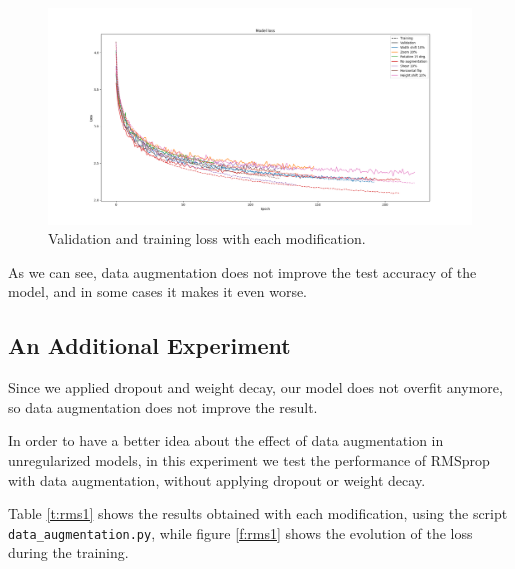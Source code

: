 \documentclass[]{article}
\begin{document}
\begin{figure}[H]
	\centering
	\includegraphics[width=\textwidth]{data_augmentation_loss}
	\caption{Validation and training loss with each modification.}
	\label{f:data1}
\end{figure}

As we can see, data augmentation does not improve the test accuracy of the model, and in some cases it makes it even worse.

\subsection{An Additional Experiment}

Since we applied dropout and weight decay, our model does not overfit anymore, so data augmentation does not improve the result.

In order to have a better idea about the effect of data augmentation in unregularized models, in this experiment we test the performance of RMSprop with data augmentation, without applying dropout or weight decay.

Table \ref{t:rms1} shows the results obtained with each modification, using the script \texttt{data\_augmentation.py}, while figure \ref{f:rms1} shows the evolution of the loss during the training.
\end{document}
